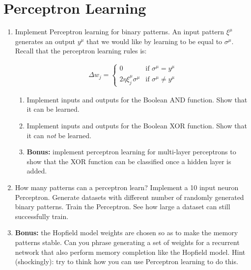 \documentclass[letterpaper,11pt]{article}
\begin{document}
\section{Perceptron Learning}
\begin{enumerate}
  \item  Implement Perceptron learning for binary patterns. An input pattern $ \xi^{\mu}$ generates an output $y^{\mu}$ that we would like by learning to be equal to $\sigma^{\mu} $.
  Recall that the perceptron learning rules is:
  
  \begin{gather}
  \Delta w_j =
  \begin{cases}
  0 &\mbox{if } \sigma^{\mu} = y^{\mu} \\ 
  2 \eta \xi_j^{\mu} \sigma^{\mu} & \mbox{if } \sigma^{\mu} \neq y^{\mu}
  \end{cases}
  \end{gather}
  
\begin{enumerate}
  \item  Implement inputs and outputs for the Boolean AND function. Show that it can be learned.
  \item  Implement inputs and outputs for the Boolean XOR function. Show that it can \emph{not} be learned.
  \item  \textbf{Bonus:} implement perceptron learning for multi-layer perceptrons to show that the XOR function can be classified once a hidden layer is added.

\end{enumerate}

	\item How many patterns can a perceptron learn? Implement a 10 input neuron Perceptron. Generate datasets with different number of randomly generated binary patterns. Train the Perceptron. See how large a dataset can still successfully train.
	
	\item \textbf{Bonus:} the Hopfield model weights are chosen so as to make the memory patterns stable. Can you phrase generating a set of weights for a recurrent network that also perform memory completion like the Hopfield model. Hint (shockingly): try to think how you can use Perceptron learning to do this.
	
\end{enumerate}




\end{document}
